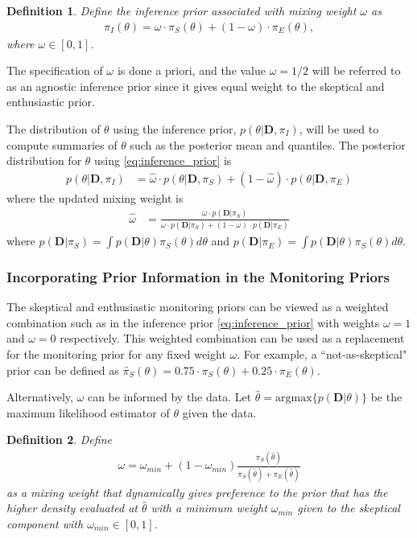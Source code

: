 \documentclass[12pt]{article}
\newtheorem{mydef}{Definition}
\begin{document}
\begin{mydef}
Define the inference prior associated with mixing weight $\omega$ as
\begin{align}\label{eq:inference_prior}
\pi_{I}\left(\theta\right)=\omega\cdot\pi_{S}\left(\theta\right)+(1-\omega) \cdot \pi_E\left(\theta\right),
\end{align}
where $\omega\in[0,1]$. 
\end{mydef}

The specification of $\omega$ is done a priori, and the value $\omega=1/2$ will be referred to as an agnostic inference prior since it gives equal weight to the skeptical and enthusiastic prior.


The distribution of $\theta$ using the inference 
prior, $p(\theta|\mathbf{D},\pi_I)$, will be used to compute summaries of $\theta$ such as the posterior mean and quantiles. The posterior distribution for $\theta$ using \eqref{eq:inference_prior} is
\begin{align*}
p(\theta|\mathbf{D},\pi_I)&=\hat{\omega}\cdot p(\theta|\mathbf{D},\pi_S)+(1-\hat{\omega})\cdot p(\theta|\mathbf{D},\pi_E)
\end{align*}
where the updated mixing weight is
\begin{align*}
\hat{\omega}&=\frac{\omega\cdot p(\mathbf{D}|\pi_S)}{\omega\cdot p(\mathbf{D}|\pi_S)+(1-\omega)\cdot p(\mathbf{D}|\pi_E)}
\end{align*}
where $p(\mathbf{D}|\pi_S)=\int p(\mathbf{D}|\theta)\pi_S(\theta)d\theta$ and $p(\mathbf{D}|\pi_E)=\int p(\mathbf{D}|\theta)\pi_S(\theta)d\theta$. 


\subsubsection{Incorporating Prior Information in the Monitoring Priors}
The skeptical and enthusiastic monitoring priors can be viewed as a weighted combination such as in the inference prior \eqref{eq:inference_prior} with weights $\omega=1$ and $\omega=0$ respectively. This weighted combination can be used as a replacement for the monitoring prior for any fixed weight $\omega$. For example, a ``not-as-skeptical" prior can be defined as $\tilde{\pi_S}(\theta)=0.75\cdot\pi_S(\theta)+0.25\cdot\pi_E(\theta)$. 

Alternatively, $\omega$ can be informed by the data. Let $\hat{\theta}=\text{argmax} \{p(\mathbf{D}|\theta)\}$ be the maximum likelihood estimator of $\theta$ given the data.
\begin{mydef}
Define
\begin{align}
\omega=\omega_{min}+(1-\omega_{min})\frac{\pi_S(\hat{\theta})}{\pi_S(\hat{\theta})+\pi_E(\hat{\theta})}
\end{align}
as a mixing weight that dynamically gives preference to the prior that has the higher density evaluated at $\hat{\theta}$ with a minimum weight $\omega_{min}$ given to the skeptical component with $\omega_{min}\in[0,1]$.
\end{mydef}
\end{document}
